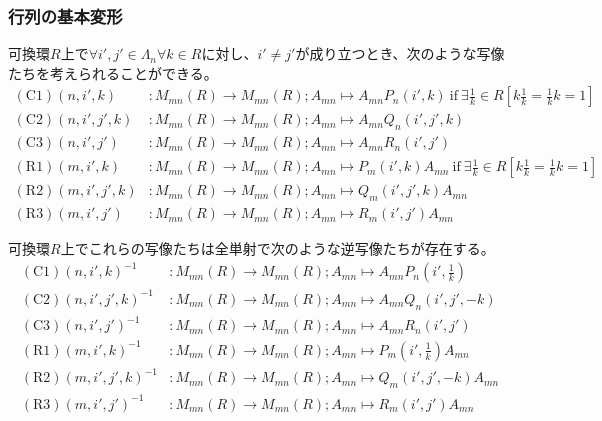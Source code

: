 \documentclass[dvipdfmx]{jsarticle}
\begin{document}
\subsubsection{行列の基本変形}%
\begin{dfn}
可換環$R$上で$\forall i',j' \in \varLambda_{n}\forall k \in R$に対し、$i' \neq j'$が成り立つとき、次のような写像たちを考えられることができる。
\begin{align*}
(\mathrm{C1})\left( n,i',k \right)&:M_{mn}(R) \rightarrow M_{mn}(R);A_{mn} \mapsto A_{mn}P_{n}\left( i',k \right)\ \mathrm{if}\ \exists\frac{1}{k} \in R\left[ k\frac{1}{k} = \frac{1}{k}k = 1 \right]\\
(\mathrm{C2})\left( n,i',j',k \right)&:M_{mn}(R) \rightarrow M_{mn}(R);A_{mn} \mapsto A_{mn}Q_{n}\left( i',j',k \right)\\
(\mathrm{C3})\left( n,i',j' \right)&:M_{mn}(R) \rightarrow M_{mn}(R);A_{mn} \mapsto A_{mn}R_{n}\left( i',j' \right)\\
(\mathrm{R1})\left( m,i',k \right)&:M_{mn}(R) \rightarrow M_{mn}(R);A_{mn} \mapsto P_{m}\left( i',k \right)A_{mn}\ \mathrm{if}\ \exists\frac{1}{k} \in R\left[ k\frac{1}{k} = \frac{1}{k}k = 1 \right]\\
(\mathrm{R2})\left( m,i',j',k \right)&:M_{mn}(R) \rightarrow M_{mn}(R);A_{mn} \mapsto Q_{m}\left( i',j',k \right)A_{mn}\\
(\mathrm{R3})\left( m,i',j' \right)&:M_{mn}(R) \rightarrow M_{mn}(R);A_{mn} \mapsto R_{m}\left( i',j' \right)A_{mn}
\end{align*}
\end{dfn}
\begin{thm}\label{2.1.7.2}
可換環$R$上でこれらの写像たちは全単射で次のような逆写像たちが存在する。
\begin{align*}
{(\mathrm{C1})\left( n,i',k \right)}^{- 1}&:M_{mn}(R) \rightarrow M_{mn}(R);A_{mn} \mapsto A_{mn}P_{n}\left( i',\frac{1}{k} \right)\\
{(\mathrm{C2})\left( n,i',j',k \right)}^{- 1}&:M_{mn}(R) \rightarrow M_{mn}(R);A_{mn} \mapsto A_{mn}Q_{n}\left( i',j', - k \right)\\
{(\mathrm{C3})\left( n,i',j' \right)}^{- 1}&:M_{mn}(R) \rightarrow M_{mn}(R);A_{mn} \mapsto A_{mn}R_{n}\left( i',j' \right)\\
{(\mathrm{R1})\left( m,i',k \right)}^{- 1}&:M_{mn}(R) \rightarrow M_{mn}(R);A_{mn} \mapsto P_{m}\left( i',\frac{1}{k} \right)A_{mn}\\
{(\mathrm{R2})\left( m,i',j',k \right)}^{- 1}&:M_{mn}(R) \rightarrow M_{mn}(R);A_{mn} \mapsto Q_{m}\left( i',j', - k \right)A_{mn}\\
{(\mathrm{R3})\left( m,i',j' \right)}^{- 1}&:M_{mn}(R) \rightarrow M_{mn}(R);A_{mn} \mapsto R_{m}\left( i',j' \right)A_{mn}
\end{align*}
\end{thm}
\end{document}
